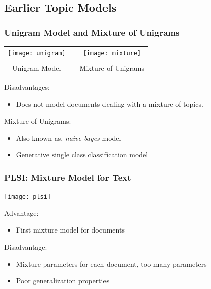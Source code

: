 \documentclass[10pt, svgnames]{beamer}
\begin{document}
\subsection{Earlier Topic Models}

\begin{frame}
\frametitle{Unigram Model and Mixture of Unigrams}

\begin{center}
\begin{tabular}{cp{2cm}c}
\texttt{[image: unigram]} & & \texttt{[image: mixture]}\\
\vspace{2pt}\\
Unigram Model & & Mixture of Unigrams\\
\end{tabular}
\end{center}

Disadvantages:
\begin{itemize}
\item \footnotesize{Does not model documents dealing with a mixture of topics.}
\end{itemize}
\vspace{10pt}
Mixture of Unigrams:
\begin{itemize}
\item \footnotesize{Also known as, {\it naive bayes} model \cite{mccallum:aaaiws98}} 
\item \footnotesize{Generative single class classification model}
\end{itemize}
\end{frame}

\begin{frame}
\frametitle{PLSI: Mixture Model for Text \cite{hofmann:sigir99}}
\begin{center}
\texttt{[image: plsi]}
\end{center}

Advantage:
\begin{itemize}
\item \footnotesize{First mixture model for documents}
\end{itemize}

Disadvantage:
\begin{itemize}
\item \footnotesize{Mixture parameters for each document, too many parameters}
\item \footnotesize{Poor generalization properties}
\end{itemize}
\end{frame}
\end{document}
